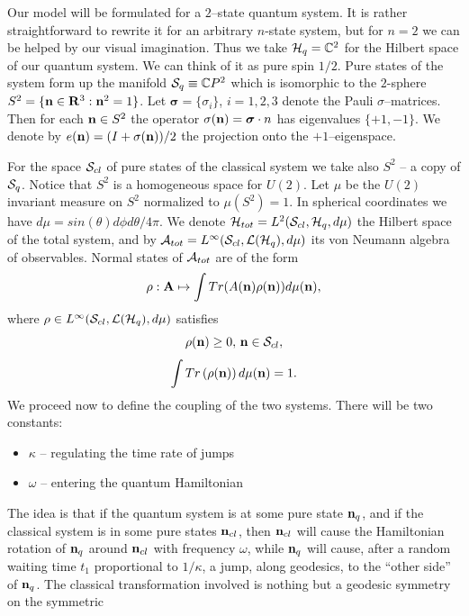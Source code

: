 \documentclass[12pt]{article}
\def\complex{{\mathbb C}}
\begin{document}
Our model will be formulated for a $2$--state quantum system.  It is
rather straightforward to rewrite it for an arbitrary $n$-state system, 
but for $n=2$ we can be helped by our visual imagination.  Thus we take
${\cal H}_q=\complex^2$ for the Hilbert space of our quantum system.  We
can think of it as pure spin $1/2$.  Pure states of the system form up
the manifold ${\cal S}_q\equiv\complex P^2$ which is isomorphic to the
$2$-sphere $S^2=\{ {\bf n}\in {\bf R}^3: {\bf n}^2=1\}$. 
Let ${\boldsymbol \sigma}=\{\sigma_i\}$, 
$i=1, 2, 3$ denote the Pauli $\sigma$--matrices.  Then for each ${\bf n}\in S^2$
the operator $\sigma ({\bf n})={\boldsymbol\sigma\cdot n}$ has eigenvalues
$\{+1, -1\} $.  We denote by $e ({\bf n})= (I+\sigma ({\bf n}))/2$ the projection
onto the $+1$--eigenspace.

For the space ${\cal S}_{cl}$ of pure states of the classical system we
take also $S^2$ -- a copy of ${\cal S}_q$.  Notice that
$S^2$ is a homogeneous space for $U (2)$.  Let $\mu$ be the $U (2)$
invariant measure on $S^2$ normalized to $\mu  (S^2)=1$.  In spherical
coordinates we have $d\mu=sin (\theta)d\phi d\theta /4\pi$. 
We denote ${\cal H}_{tot}=L^2 ({\cal S}_{cl}, {\cal H}_q, d\mu )$ the 
Hilbert space of the total system,  and by 
${\cal A}_{tot}=L^{\infty} ({\cal S}_{cl}, 
{\cal L} ({\cal H}_q), d\mu )$ its von Neumann algebra of observables. 
 Normal states of ${\cal A}_{tot}$ are 
of the form $$\rho: {\bf A}\mapsto\int Tr (A ({\bf n})\rho ({\bf n}))d\mu ({\bf n}), $$
where
$\rho\in L^{\infty} ({\cal S}_{cl},  {\cal L} ({\cal H}_q), d\mu )$  satisfies
$$\rho  ({\bf n})\geq 0 , \,  {\bf n}\in {\cal S}_{cl} , $$
$$\int Tr \left (\rho  ({\bf n})\right) d\mu  ({\bf n}) =1 . $$
We proceed now to define the coupling of the two systems.  There will be two
constants:  
\begin{itemize}
\item $\kappa$ -- regulating the time rate of jumps 
\item $\omega$ -- entering the quantum Hamiltonian 
\end{itemize}
 The idea is that if the quantum system is at some pure state
${\bf n}_q$,  and if the classical system is in some pure states ${\bf n}_{cl}$, 
then
${\bf n}_{cl}$ will cause 
the Hamiltonian rotation of ${\bf n}_{q}$  around
${\bf n}_{cl}$ with frequency $\omega$,  while ${\bf n}_q$ will cause,  
after a random waiting time $t_1$ proportional to $1/\kappa$,  
a jump,  along geodesics,  to the ``other side'' of ${\bf n}_q$. 
The classical transformation involved 
is nothing but a geodesic symmetry on the symmetric
\end{document}
